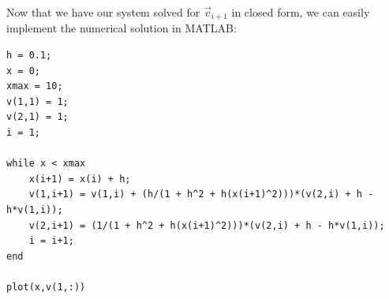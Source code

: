 \documentclass[letterpaper, fontsize=10pt]{scrartcl} %
\numberwithin{equation}{section} %
\numberwithin{figure}{section} %
\numberwithin{table}{section} %
\begin{document}
\begin{enumerate}
Now that we have our system solved for $\vec v_{i+1}$ in closed form, we can easily implement the numerical solution in MATLAB:

\begin{lstlisting} 
h = 0.1;
x = 0; 
xmax = 10;
v(1,1) = 1;
v(2,1) = 1;
i = 1;

while x < xmax
	x(i+1) = x(i) + h;
	v(1,i+1) = v(1,i) + (h/(1 + h^2 + h(x(i+1)^2)))*(v(2,i) + h - h*v(1,i));
	v(2,i+1) = (1/(1 + h^2 + h(x(i+1)^2)))*(v(2,i) + h - h*v(1,i));
	i = i+1;
end

plot(x,v(1,:))

\end{lstlisting}

\end{enumerate}

\end{document}
